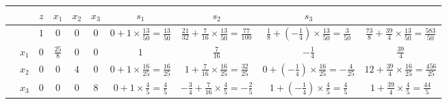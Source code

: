 \documentclass[a4paper,12pt]{article}
\begin{document}
\begin{table}[H]
    \tiny
    \begin{tabularx}{\textwidth}{cc|ccccccc|c}
         &       & $z$ & $x_1$          & $x_2$ & $x_3$ & $s_1$                                        & $s_2$                                                                & $s_3$                                                              &                                                                     \\
        \hline
         &       & $1$ & $0$            & $0$   & $0$   & $0 + 1 \times \frac{13}{50} = \frac{13}{50}$ & $\frac{21}{32} + \frac{7}{16} \times \frac{13}{50} = \frac{77}{100}$ & $\frac{1}{8} + (-\frac{1}{4}) \times \frac{13}{50} = \frac{3}{50}$ & $\frac{73}{8} + \frac{39}{4} \times \frac{13}{50} = \frac{583}{50}$ \\
        \hline
         & $x_1$ & $0$ & $\frac{25}{8}$ & $0$   & $0$   & $1$                                          & $\frac{7}{16}$                                                       & $-\frac{1}{4}$                                                     & $\frac{39}{4}$                                                      \\
         & $x_2$ & $0$ & $0$            & $4$   & $0$   & $0 + 1 \times \frac{16}{25} = \frac{16}{25}$ & $1 + \frac{7}{16} \times \frac{16}{25} = \frac{32}{25}$              & $0 + (-\frac{1}{4}) \times \frac{16}{25} = -\frac{4}{25}$          & $12 + \frac{39}{4} \times \frac{16}{25} = \frac{456}{25}$           \\
         & $x_3$ & $0$ & $0$            & $0$   & $8$   & $0 + 1 \times \frac{4}{5} = \frac{4}{5}$     & $-\frac{3}{4} + \frac{7}{16} \times \frac{4}{5} = -\frac{2}{5}$      & $1 + (-\frac{1}{4}) \times \frac{4}{5} = \frac{4}{5}$              & $1 + \frac{39}{4} \times \frac{4}{5} = \frac{44}{5}$                \\
    \end{tabularx}
\end{table}
\end{document}

